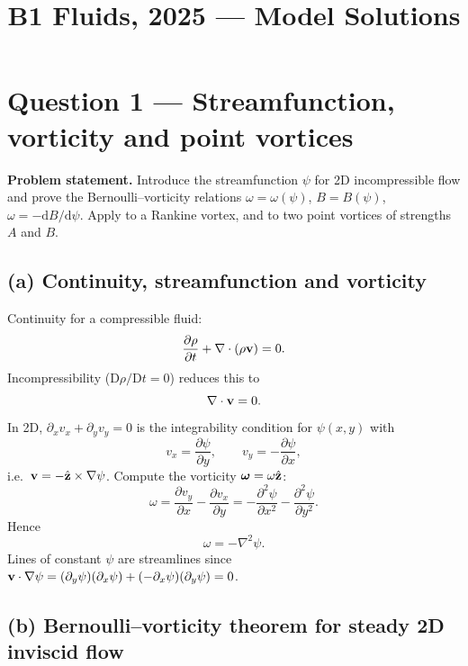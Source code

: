 \documentclass[11pt]{article}
\title{B1 Fluids, 2025 --- Model Solutions}
\author{}
\date{}
\newcommand{\D}{\mathrm{D}}
\newcommand{\de}{\mathrm{d}}
\newcommand{\pd}[2]{\frac{\partial #1}{\partial #2}}
\newcommand{\pdd}[2]{\frac{\partial^{2} #1}{\partial #2^{2}}}
\begin{document}
\maketitle

\section*{Question 1 --- Streamfunction, vorticity and point vortices}

\textbf{Problem statement.} Introduce the streamfunction $\psi$ for 2D incompressible flow and prove the Bernoulli--vorticity relations $\omega=\omega(\psi)$, $B=B(\psi)$, $\omega=-\de B/\de\psi$. Apply to a Rankine vortex, and to two point vortices of strengths $A$ and $B$.

\subsection*{(a) Continuity, streamfunction and vorticity}

Continuity for a compressible fluid:
\begin{equation}
\pd{\rho}{t} + \nabla\cdot(\rho\vb v) = 0.
\end{equation}
Incompressibility ($\D\rho/\D t=0$) reduces this to
\[ \nabla\cdot\vb v = 0. \]
In 2D, $\partial_x v_x + \partial_y v_y = 0$ is the integrability condition for $\psi(x,y)$ with
\[ v_x = \pd{\psi}{y},\qquad v_y = -\pd{\psi}{x}, \]
i.e.\ $\vb v = -\hat{\vb z}\times\nabla\psi$. Compute the vorticity $\bm\omega = \omega\hat{\vb z}$:
\[ \omega = \pd{v_y}{x} - \pd{v_x}{y} = -\pdd{\psi}{x} - \pdd{\psi}{y}. \]
Hence
\begin{equation}
\boxed{\;\omega = -\nabla^{2}\psi.\;}
\end{equation}
Lines of constant $\psi$ are streamlines since $\vb v\cdot\nabla\psi = (\partial_y\psi)(\partial_x\psi)+(-\partial_x\psi)(\partial_y\psi) = 0$.

\subsection*{(b) Bernoulli--vorticity theorem for steady 2D inviscid flow}
\end{document}
